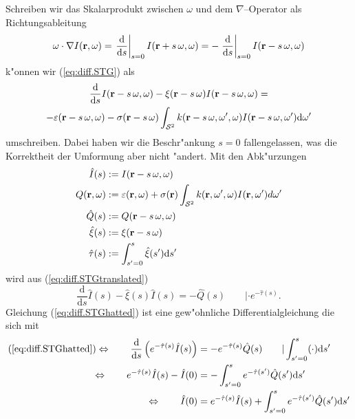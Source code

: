 \documentclass[11pt,a4paper,DIVcalc,BCOR8mm,titlepage,twoside]{scrartcl}
\begin{document}
	Schreiben wir das Skalarprodukt zwischen $\omega$ und dem $\nabla$--Operator als Richtungsableitung
	\newcommand{\dds}{\frac{\text{d}}{\text{d}s}}
	\newcommand{\ddszero}{\left. \dds \right|_{s=0}}
	\begin{equation*}
		\omega \cdot \nabla I(\location{r},\omega)
		=  \ddszero I(\location{r}+s\,\omega,\omega)
		=  -\ddszero I(\location{r}-s\,\omega,\omega)
	\end{equation*}
	k"onnen wir (\ref{eq:diff.STG}) als
	\begin{multline}
		\dds I(\location{r}-s\,\omega,\omega) - \xi(\location{r}-s\,\omega)I(\location{r}-s\,\omega,\omega) = \\-\varepsilon(\location{r}-s\,\omega,\omega) -\sigma(\location{r}-s\,\omega) \int_{\mathcal{S}^2} k(\location{r}-s\,\omega,\omega',\omega)I(\location{r}-s\,\omega,\omega') \text{d}\omega'
		\label{eq:diff.STGtranslated}
	\end{multline}
	umschreiben. Dabei haben wir die Beschr"ankung $s=0$ fallengelassen, was die Korrektheit der Umformung aber nicht "andert. Mit den Abk"urzungen
	\begin{align*}
		{\hat I}(s)&:=I(\mathbf{r}-s\,\omega,\omega) \\
		Q(\mathbf{r},\omega)&:= \varepsilon(\mathbf{r},\omega)+\sigma(\mathbf{r}) \int_{\mathcal{S}^2} k(\mathbf{r},\omega',\omega)I(\mathbf{r},\omega') d\omega' \\
		{\hat Q}(s)&:=Q(\mathbf{r}-s\,\omega,\omega)\\
		{\hat \xi}(s)&:=\xi(\mathbf{r}-s\,\omega) \\
		{\hat \tau}(s)&:= \int_{s'=0}^{s} {\hat \xi}(s') \text{d}s'
	\end{align*}
	wird aus (\ref{eq:diff.STGtranslated})
	\begin{equation}
		\dds {\hat I}(s) - {\hat \xi}(s){\hat I}(s)= -{\hat Q}(s) \qquad |\cdot e^{-{\hat \tau}(s)}.
		\label{eq:diff.STGhatted}
	\end{equation}
	Gleichung (\ref{eq:diff.STGhatted}) ist eine gew"ohnliche Differentialgleichung die sich mit
	\begin{align}
		(\ref{eq:diff.STGhatted})\Leftrightarrow\qquad \dds \left(e^{-{\hat \tau}(s)} {\hat I}(s)\right)&= -e^{-{\hat \tau}(s)} {\hat Q}(s) \qquad | \int_{s'=0}^s (\cdot)\text{d}s' \nonumber \\
		\Leftrightarrow\qquad e^{-{\hat \tau}(s)} {\hat I}(s) - {\hat I}(0) &= -\int_{s'=0}^s e^{-{\hat \tau}(s')} {\hat Q}(s') \text{d}s' \nonumber \\
		\Leftrightarrow\qquad {\hat I}(0) &= e^{-{\hat \tau}(s)} {\hat I}(s) + \int_{s'=0}^s e^{-{\hat \tau}(s')} {\hat Q}(s') \text{d}s' \label{eq:diff.STGpreintegral}
	\end{align}
\end{document}
